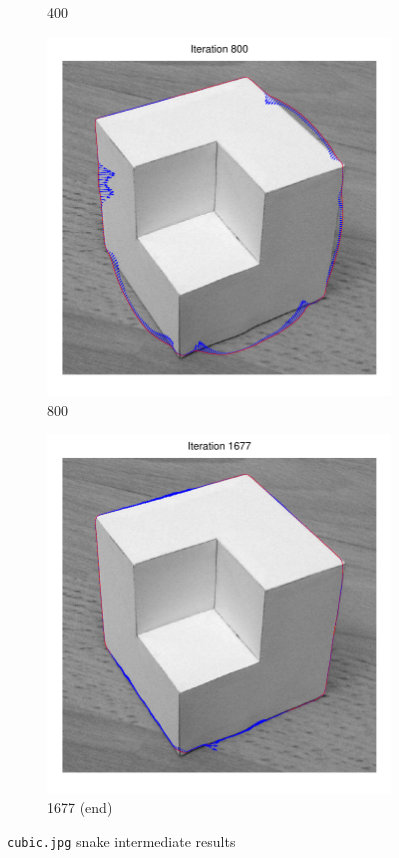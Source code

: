 \documentclass[11pt,a4paper]{article}
\begin{document}
\begin{figure}[H]
\begin{subfigure}[t]{0.48\textwidth}
        \caption{400}
        \label{fig:cubic_400}
    \end{subfigure}
    \begin{subfigure}[t]{0.48\textwidth}
        \includegraphics[width=\textwidth]{src/images/cubic_800.pdf}
        \caption{800}
        \label{fig:cubic_800}
    \end{subfigure}
    \begin{subfigure}[t]{0.48\textwidth}
        \includegraphics[width=\textwidth]{src/images/cubic_1677.pdf}
        \caption{1677 (end)}
        \label{fig:cubic_end}
    \end{subfigure}
    \caption{\texttt{cubic.jpg} snake intermediate results}
    \label{fig:cubic_intermediate}
\end{figure}
\end{document}
